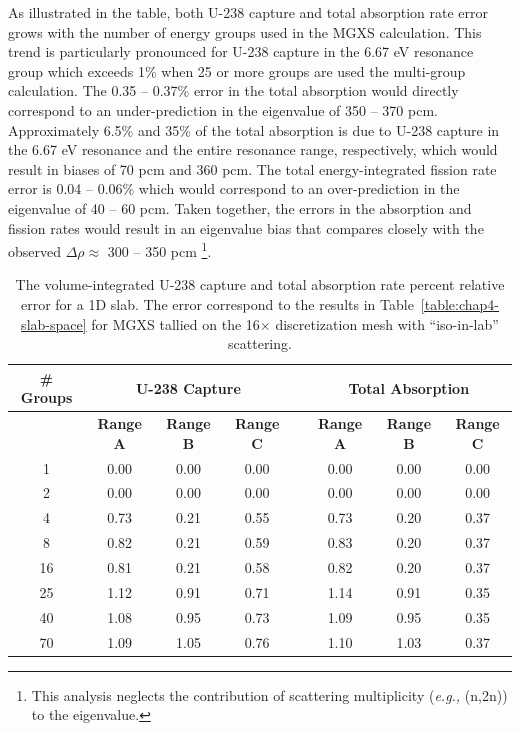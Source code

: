 As illustrated in the table, both U-238 capture and total absorption rate error grows with the number of energy groups used in the \ac{MGXS} calculation. This trend is particularly pronounced for U-238 capture in the 6.67 eV resonance group which exceeds 1\% when 25 or more groups are used the multi-group calculation. The 0.35 -- 0.37\% error in the total absorption would directly correspond to an under-prediction in the eigenvalue of 350 -- 370 pcm. Approximately 6.5\% and 35\% of the total absorption is due to U-238 capture in the 6.67 eV resonance and the entire resonance range, respectively, which would result in biases of 70 pcm and 360 pcm. The total energy-integrated fission rate error is 0.04 -- 0.06\% which would correspond to an over-prediction in the eigenvalue of 40 -- 60 pcm. Taken together, the errors in the absorption and fission rates would result in an eigenvalue bias that compares closely with the observed $\Delta\rho \approx$ 300 -- 350 pcm \footnote{This analysis neglects the contribution of scattering multiplicity (\textit{e.g.,} (n,2n)) to the eigenvalue.}.

\begin{table}[h!]
  \centering
  \caption[Reaction rate relative error for a 1D slab.]{The volume-integrated U-238 capture and total absorption rate percent relative error for a 1D slab. The error correspond to the results in Table~\ref{table:chap4-slab-space} for \ac{MGXS} tallied on the 16$\times$ discretization mesh with ``iso-in-lab'' scattering.}
  \small
  \label{table:chap4-slab-capture-errors} 
  \vspace{6pt}
  \begin{tabular}{c c c c c c c c}
  \toprule
  \multicolumn{1}{c}{\bf \# Groups} &
  \multicolumn{3}{c}{\bf U-238 Capture} &
  \multicolumn{1}{c}{} &
  \multicolumn{3}{c}{\bf Total Absorption} \\
  \midrule
  & \multicolumn{1}{c}{\bf Range A} &
  \multicolumn{1}{c}{\bf Range B} &
  \multicolumn{1}{c}{\bf Range C} &
  \multicolumn{1}{c}{} &
  \multicolumn{1}{c}{\bf Range A} &
  \multicolumn{1}{c}{\bf Range B} &
  \multicolumn{1}{c}{\bf Range C} \\
  \cline{2-4} \cline{6-8}
1 & 0.00 & 0.00 & 0.00 & & 0.00 & 0.00 & 0.00 \\
2 & 0.00 & 0.00 & 0.00 & & 0.00 & 0.00 & 0.00 \\
4 & 0.73 & 0.21 & 0.55 & & 0.73 & 0.20 & 0.37 \\
8 & 0.82 & 0.21 & 0.59 & & 0.83 & 0.20 & 0.37 \\
16 & 0.81 & 0.21 & 0.58 & & 0.82 & 0.20 & 0.37 \\
25 & 1.12 & 0.91 & 0.71 & & 1.14 & 0.91 & 0.35 \\
40 & 1.08 & 0.95 & 0.73 & & 1.09 & 0.95 & 0.35 \\
70 & 1.09 & 1.05 & 0.76 & & 1.10 & 1.03 & 0.37 \\
  \bottomrule
\end{tabular}
\end{table}

